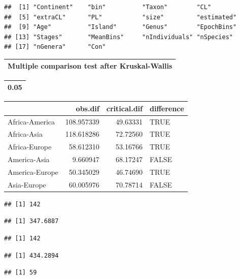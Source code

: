 \documentclass[]{article}
\begin{document}
\begin{verbatim}
##  [1] "Continent"    "bin"          "Taxon"        "CL"          
##  [5] "extraCL"      "PL"           "size"         "estimated"   
##  [9] "Age"          "Island"       "Genus"        "EpochBins"   
## [13] "Stages"       "MeanBins"     "nIndividuals" "nSpecies"    
## [17] "nGenera"      "Con"
\end{verbatim}

\begin{table}

\centering
\begin{tabular}[t]{l}
\hline
Multiple comparison test after Kruskal-Wallis\\
\hline
\end{tabular}
\centering
\begin{tabular}[t]{r}
\hline
0.05\\
\hline
\end{tabular}
\centering
\begin{tabular}[t]{l|r|r|l}
\hline
  & obs.dif & critical.dif & difference\\
\hline
Africa-America & 108.957339 & 49.63331 & TRUE\\
\hline
Africa-Asia & 118.618286 & 72.72560 & TRUE\\
\hline
Africa-Europe & 58.612310 & 53.16766 & TRUE\\
\hline
America-Asia & 9.660947 & 68.17247 & FALSE\\
\hline
America-Europe & 50.345029 & 46.74690 & TRUE\\
\hline
Asia-Europe & 60.005976 & 70.78714 & FALSE\\
\hline
\end{tabular}
\end{table}

\begin{verbatim}
## [1] 142
\end{verbatim}

\begin{verbatim}
## [1] 347.6887
\end{verbatim}

\begin{verbatim}
## [1] 142
\end{verbatim}

\begin{verbatim}
## [1] 434.2894
\end{verbatim}

\begin{verbatim}
## [1] 59
\end{verbatim}
\end{document}
